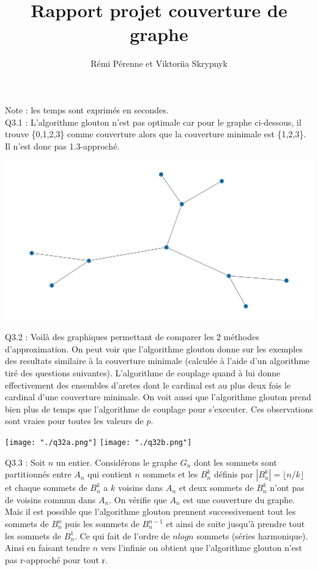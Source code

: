 \documentclass[a4paper]{article}
\begin{document}
\title{Rapport projet couverture de graphe}
\author{Rémi Pérenne et Viktoriia Skrypnyk}
\maketitle

Note : les temps sont exprimés en secondes. \\

Q3.1 :
L'algorithme glouton n'est pas optimale car pour le graphe ci-dessous, il trouve \{0,1,2,3\} comme couverture alors que la couverture minimale est \{1,2,3\}. Il n'est donc pas 1.3-approché.

\includegraphics{"./graphe_q31.png"}

Q3.2 :
Voilà des graphiques permettant de comparer les 2 méthodes d'approximation. On peut voir que l'algorithme glouton donne sur les exemples des resultats similaire à la couverture minimale (calculée à l'aide d'un algorithme tiré des questions suivantes). L'algorithme de couplage quand à lui donne effectivement des ensembles d'aretes dont le cardinal est au plus deux fois le cardinal d'une couverture minimale. On voit aussi que l'algorithme glouton prend bien plus de temps que l'algorithme de couplage pour s'executer. Ces observations sont vraies pour toutes les valeurs de $p$.

\texttt{[image: "./q32a.png"]}
\texttt{[image: "./q32b.png"]}

Q3.3 :
Soit $n$ un entier. Considérons le graphe $G_n$ dont les sommets sont partitionnés entre $A_n$ qui contient $n$ sommets et les $B_n^k$ définis par $|B_n^k| = \lfloor n/k \rfloor $ et chaque sommets de $B_n^k$ a $k$ voisins dans $A_n$ et deux sommets de $B_n^k$ n'ont pas de voisins commun dans $A_n$. On vérifie que $A_n$ est une couverture du graphe. Mais il est possible que l'algorithme glouton prennent successivement tout les sommets de $B_n^n$ puis les sommets de $B_n^{n-1}$ et ainsi de suite jusqu'à prendre tout les sommets de $B_n^1$. Ce qui fait de l'ordre de $nlogn$ sommets (séries harmonique). Ainsi en faisant tendre $n$ vers l'infinie on obtient que l'algorithme glouton n'est pas r-approché pour tout r.
\\
\end{document}

